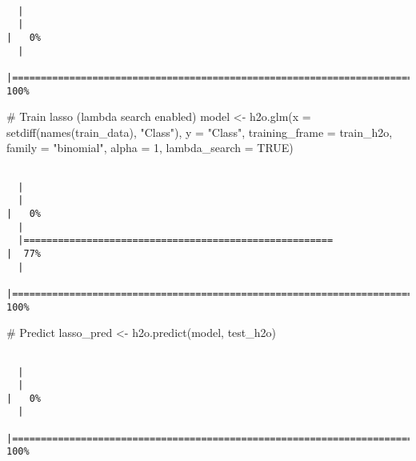\documentclass[
  11pt,
  letterpaper,
  DIV=11,
  numbers=noendperiod]{scrartcl}
\newenvironment{Shaded}{}{}
\newcommand{\AttributeTok}[1]{\textcolor[rgb]{0.84,0.23,0.29}{#1}}
\newcommand{\CommentTok}[1]{\textcolor[rgb]{0.42,0.45,0.49}{#1}}
\newcommand{\ConstantTok}[1]{\textcolor[rgb]{0.00,0.36,0.77}{#1}}
\newcommand{\DecValTok}[1]{\textcolor[rgb]{0.00,0.36,0.77}{#1}}
\newcommand{\FunctionTok}[1]{\textcolor[rgb]{0.44,0.26,0.76}{#1}}
\newcommand{\NormalTok}[1]{\textcolor[rgb]{0.14,0.16,0.18}{#1}}
\newcommand{\OtherTok}[1]{\textcolor[rgb]{0.44,0.26,0.76}{#1}}
\newcommand{\StringTok}[1]{\textcolor[rgb]{0.01,0.18,0.38}{#1}}
\begin{document}
\begin{verbatim}

  |                                                                            
  |                                                                      |   0%
  |                                                                            
  |======================================================================| 100%
\end{verbatim}

\begin{Shaded}
\begin{Highlighting}[]
\CommentTok{\# Train lasso (lambda search enabled)}
\NormalTok{model }\OtherTok{\textless{}{-}} \FunctionTok{h2o.glm}\NormalTok{(}\AttributeTok{x =} \FunctionTok{setdiff}\NormalTok{(}\FunctionTok{names}\NormalTok{(train\_data), }\StringTok{"Class"}\NormalTok{),}
                 \AttributeTok{y =} \StringTok{"Class"}\NormalTok{,}
                 \AttributeTok{training\_frame =}\NormalTok{ train\_h2o,}
                 \AttributeTok{family =} \StringTok{"binomial"}\NormalTok{,}
                 \AttributeTok{alpha =} \DecValTok{1}\NormalTok{,}
                 \AttributeTok{lambda\_search =} \ConstantTok{TRUE}\NormalTok{)}
\end{Highlighting}
\end{Shaded}

\begin{verbatim}

  |                                                                            
  |                                                                      |   0%
  |                                                                            
  |======================================================                |  77%
  |                                                                            
  |======================================================================| 100%
\end{verbatim}

\begin{Shaded}
\begin{Highlighting}[]
\CommentTok{\# Predict}
\NormalTok{lasso\_pred }\OtherTok{\textless{}{-}} \FunctionTok{h2o.predict}\NormalTok{(model, test\_h2o)}
\end{Highlighting}
\end{Shaded}

\begin{verbatim}

  |                                                                            
  |                                                                      |   0%
  |                                                                            
  |======================================================================| 100%
\end{verbatim}
\end{document}
